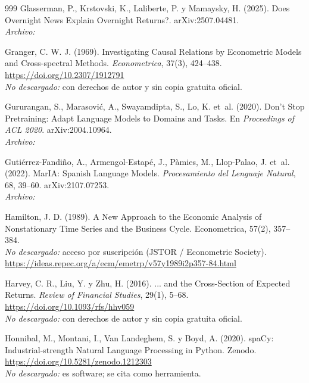 \begin{thebibliography}{999}
Glasserman, P., Krstovski, K., Laliberte, P. y Mamaysky, H. (2025). Does Overnight News Explain Overnight Returns?. arXiv:2507.04481.
\\\textit{Archivo:} 

Granger, C. W. J. (1969). Investigating Causal Relations by Econometric Models and Cross-spectral Methods. \emph{Econometrica}, 37(3), 424--438. \url{https://doi.org/10.2307/1912791}
\\\textit{No descargado:} con derechos de autor y sin copia gratuita oficial.

Gururangan, S., Marasovi{\'c}, A., Swayamdipta, S., Lo, K. et~al. (2020). Don't Stop Pretraining: Adapt Language Models to Domains and Tasks. En \emph{Proceedings of ACL 2020}. arXiv:2004.10964.
\\\textit{Archivo:} 

Guti{\'e}rrez-Fandi{\~n}o, A., Armengol-Estap{\'e}, J., P{\`a}mies, M., Llop-Palao, J. et~al. (2022). {MarIA}: Spanish Language Models. \emph{Procesamiento del Lenguaje Natural}, 68, 39--60. arXiv:2107.07253.
\\\textit{Archivo:} 

Hamilton, J. D. (1989). A New Approach to the Economic Analysis of Nonstationary Time Series and the Business Cycle. Econometrica, 57(2), 357–384.
\\\textit{No descargado:} acceso por suscripción (JSTOR / Econometric Society). \url{https://ideas.repec.org/a/ecm/emetrp/v57y1989i2p357-84.html}

Harvey, C. R., Liu, Y. y Zhu, H. (2016). ... and the Cross-Section of Expected Returns. \emph{Review of Financial Studies}, 29(1), 5--68. \url{https://doi.org/10.1093/rfs/hhv059}
\\\textit{No descargado:} con derechos de autor y sin copia gratuita oficial.

Honnibal, M., Montani, I., Van Landeghem, S. y Boyd, A. (2020). {spaCy}: Industrial-strength Natural Language Processing in Python. Zenodo. \url{https://doi.org/10.5281/zenodo.1212303}
\\\textit{No descargado:} es software; se cita como herramienta.


\end{thebibliography}
